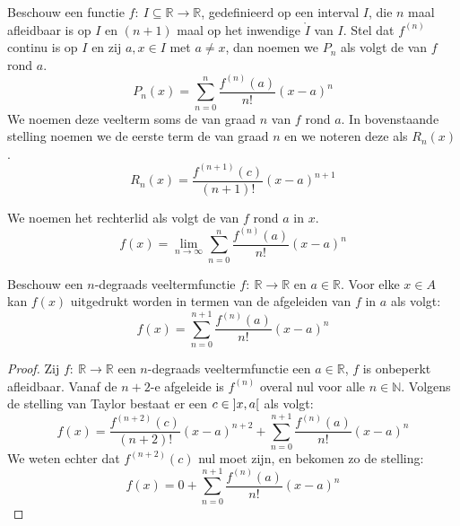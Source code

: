 \documentclass[main.tex]{subfiles}
\begin{document}
\begin{de}
  Beschouw een functie $f:\ I \subseteq \mathbb{R} \rightarrow \mathbb{R}$, gedefinieerd op een interval $I$, die $n$ maal afleidbaar is op $I$ en $(n+1)$ maal op het inwendige $\mathring{I}$ van $I$.
  Stel dat $f^{(n)}$ continu is op $I$ en zij $a,x\in I$ met $a \neq x$, dan noemen we $P_{n}$ als volgt de  van $f$ rond $a$.
  \[ 
  P_{n}(x) = \sum_{n = 0}^{n}\frac{f^{(n)}(a)}{n!}(x-a)^{n} 
  \]
  We noemen deze veelterm soms de  van graad $n$ van $f$ rond $a$.
  In bovenstaande stelling noemen we de eerste term de  van graad $n$ en we noteren deze als $R_{n}(x)$.
  \[ 
  R_{n}(x) = \frac{f^{(n+1)}(c)}{(n+1)!}(x-a)^{n+1} 
  \]
\end{de}

\begin{de}
  We noemen het rechterlid als volgt de  van $f$ rond $a$ in $x$.
  \[
  f(x) = \lim_{n \rightarrow \infty}\sum_{n = 0}^{n}\frac{f^{(n)}(a)}{n!}(x-a)^{n} 
  \]
\end{de}

\begin{st}
  Beschouw een $n$-degraads veeltermfunctie $f:\ \mathbb{R} \rightarrow \mathbb{R}$ en $a\in \mathbb{R}$.
  Voor elke $x\in A$ kan $f(x)$ uitgedrukt worden in termen van de afgeleiden van $f$ in $a$ als volgt:
  \[ 
  f(x) = \sum_{n = 0}^{n+1}\frac{f^{(n)}(a)}{n!}(x-a)^{n} 
  \]
  \begin{proof}
    Zij $f:\ \mathbb{R} \rightarrow \mathbb{R}$ een $n$-degraads veeltermfunctie een $a\in \mathbb{R}$, $f$ is onbeperkt afleidbaar.\needed
    Vanaf de $n+2$-e afgeleide is $f^{(n)}$ overal nul voor alle $n\in \mathbb{N}$.
    Volgens de stelling van Taylor bestaat er een $c\in\interval[open]{x}{a}$ als volgt:
    \[ f(x) = \frac{f^{(n+2)}(c)}{(n+2)!}(x-a)^{n+2} + \sum_{n = 0}^{n+1}\frac{f^{(n)}(a)}{n!}(x-a)^{n} \]
    We weten echter dat $f^{(n+2)}(c)$ nul moet zijn, en bekomen zo de stelling:
    \[ f(x) = 0 + \sum_{n = 0}^{n+1}\frac{f^{(n)}(a)}{n!}(x-a)^{n} \]
  \end{proof}
\end{st}
\end{document}
